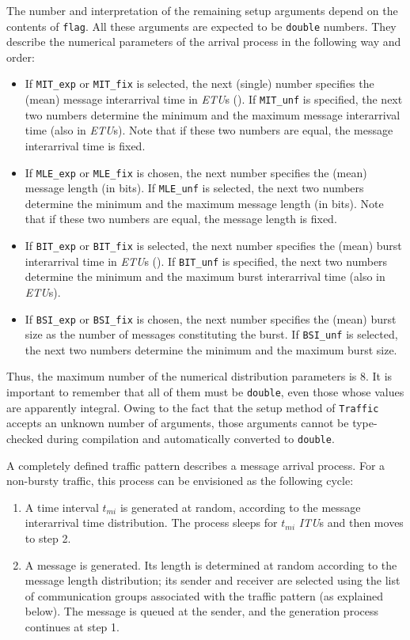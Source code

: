 The number and interpretation of the remaining setup arguments depend
on the contents of {\tt flag}.
All these arguments are expected to be {\tt double} numbers.
They describe the numerical parameters of the arrival process in the following
way and order:
\begin{itemize}
\item
If {\tt MIT\_exp} or {\tt MIT\_fix}
is selected, the next (single) number specifies the (mean)
message interarrival time in {\em ETU\/}s ().
If {\tt MIT\_unf} is specified, the next two numbers determine the
minimum and the maximum message interarrival time (also in {\em ETU\/}s).
Note that if these two numbers are equal, the message interarrival time is
fixed.
\item
If {\tt MLE\_exp} or {\tt MLE\_fix}
is chosen, the next number specifies the (mean)
message length (in bits).
If {\tt MLE\_unf} is selected, the next two numbers determine the
minimum and the maximum message length (in bits).
Note that if these two numbers are equal, the message length is
fixed.
\item
If {\tt BIT\_exp} or {\tt BIT\_fix}
is selected, the next number specifies the (mean)
burst interarrival time in {\em ETU\/}s ().
If {\tt BIT\_unf} is specified, the next two numbers determine the
minimum and the maximum burst interarrival time (also in {\em ETU\/}s).
\item
If {\tt BSI\_exp} or {\tt BSI\_fix}
is chosen, the next number specifies the (mean)
burst size as the number of messages constituting the burst.
If {\tt BSI\_unf} is selected, the next two numbers determine the
minimum and the maximum burst size.
\end{itemize}

Thus, the maximum number of the numerical distribution parameters is 8.
It is important to remember that all of them must be {\tt double},
even those whose values are apparently integral.
Owing to the fact that the setup method of {\tt Traffic} accepts an unknown
number of arguments, those arguments cannot be type-checked during compilation
and automatically converted to {\tt double}.

A completely defined traffic pattern describes a message arrival process.
For a non-bursty traffic, this process can be envisioned as the following
cycle:
\begin{enumerate}
\item
A time interval $t_{mi}$ is generated at random, according to the message
interarrival time distribution.
The process sleeps for $t_{mi}$ {\em ITU\/}s and then moves to step 2.
\item
A message is generated.
Its length is determined at random according to the message length
distribution; its sender and receiver are selected using the list of
communication groups associated with the traffic pattern (as explained below).
The message is queued at the sender, and the generation process continues
at step 1.
\end{enumerate}

